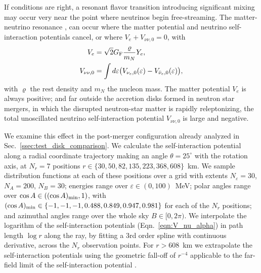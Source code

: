 \documentclass[aps,floatfix,prd,superscriptaddress,twocolumn]{revtex4-1}
\begin{document}
If conditions are right, a resonant flavor transition
introducing significant mixing may occur very near
the point where neutrinos begin free-streaming.
The matter-neutrino resonance
\cite{malk2012-mnr_1,malk2015-mnr_2,malk2016-mnr_3},
can occur where the matter potential and
neutrino self-interaction potentials cancel,
or where $V_e + V_{\nu\nu,0}=0$, with
\begin{align}
  \label{eqn:V_e}
  V_e &= \sqrt{2} G_{\rm F} \frac{\varrho}{m_N} Y_e, \\
  \label{eqn:V_nunu0}
  V_{\nu\nu,0} &= \int d\varepsilon
  \big(V_{\nu_e,0}(\varepsilon)-V_{\bar{\nu}_e,0}(\varepsilon)\big),
\end{align}
with $\varrho$ the rest density and $m_{N}$ the nucleon mass.
The matter potential $V_e$ is always positive;
and far outside the accretion disks formed in neutron star mergers,
in which the disrupted neutron-star matter is rapidly releptonizing,
the total unoscillated neutrino self-interaction potential $V_{\nu\nu,0}$
is large and negative.

We examine this effect in the post-merger configuration already analyzed
in Sec.~\ref{ssec:test_disk_comparison}.
We calculate the self-interaction potential along a radial coordinate trajectory
making an angle $\theta=25^\circ$ with the rotation axis,
at $N_r=7$ positions $r\in\{30,50,82,135,223,368,608\}$~km.
We sample distribution functions at each of these positions over a grid
with extents $N_\varepsilon=30$, $N_A=200$, $N_B=30$;
energies range over $\varepsilon\in(0,100)$~MeV;
polar angles range over $\cos A \in ((\cos A)_{\rm min}, 1)$, with
$(\cos A)_{\rm min}\in\{-1,-1,-1,0.488,0.849,0.947,0.981\}$
for each of the $N_r$ positions;
and azimuthal angles range over the whole sky $B\in[0,2\pi)$.
We interpolate the logarithm of the self-interaction potentials
(Eqn.~\ref{eqn:V_nu_alpha})
in path length $\log r$ along the ray,
by fitting a 3rd order spline with continuous derivative,
across the $N_r$ observation points.
For $r>608$~km we extrapolate the self-interaction potentials using the
geometric fall-off of $r^{-4}$ applicable to the far-field limit of the
self-interaction potential \cite{malk2016-mnr_3}.
\end{document}
